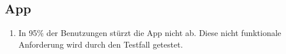 \subsection*{App}

\begin{samepage}
    \begin{enumerate}[label=\textbf{/NFZ\arabic*0/}, align=left]
        \item \label{/NFZ10/} In 95\% der Benutzungen stürzt die App nicht ab. Diese nicht funktionale Anforderung wird durch den Testfall  getestet.
    \end{enumerate}
\end{samepage}